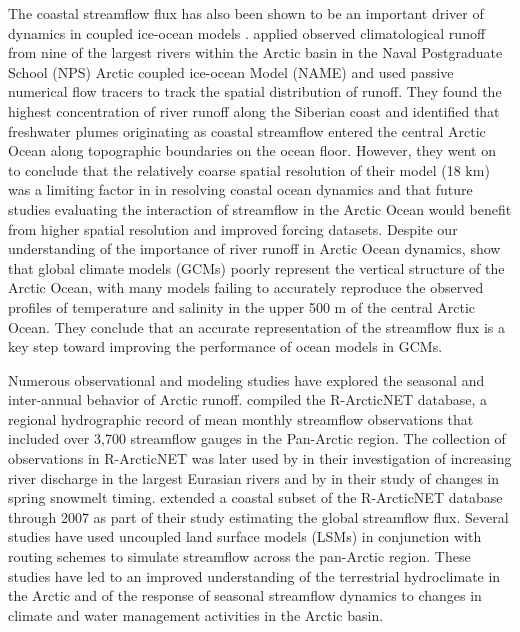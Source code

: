 The coastal streamflow flux has also been shown to be an important driver of dynamics in coupled ice-ocean models \citep[e.g.][]{Newton_2008,Large_2009,Lique_2015}.
\citet{Newton_2008} applied observed climatological runoff from nine of the largest rivers within the Arctic basin in the Naval Postgraduate School (NPS) Arctic coupled ice-ocean Model (NAME) and used passive numerical flow tracers to track the spatial distribution of runoff.
They found the highest concentration of river runoff along the Siberian coast and identified that freshwater plumes originating as coastal streamflow entered the central Arctic Ocean along topographic boundaries on the ocean floor.
However, they went on to conclude that the relatively coarse spatial resolution of their model (18 km) was a limiting factor in in resolving coastal ocean dynamics and that future studies evaluating the interaction of streamflow in the Arctic Ocean would benefit from higher spatial resolution and improved forcing datasets.
Despite our understanding of the importance of river runoff in Arctic Ocean dynamics, \citet{Nummelin_2015} show that global climate models (GCMs) poorly represent the vertical structure of the Arctic Ocean, with many models failing to accurately reproduce the observed profiles of temperature and salinity in the upper 500 m of the central Arctic Ocean.
They conclude that an accurate representation of the streamflow flux is a key step toward improving the performance of ocean models in GCMs.

Numerous observational and modeling studies have explored the seasonal and inter-annual behavior of Arctic runoff.
\citet{Lammers_2001} compiled the R-ArcticNET database, a regional hydrographic record of mean monthly streamflow observations that included over 3,700 streamflow gauges in the Pan-Arctic region.
The collection of observations in R-ArcticNET was later used by \citet{Shiklomanov_2009} in their investigation of increasing river discharge in the largest Eurasian rivers and by \citet{Tan_2011} in their study of changes in spring snowmelt timing.
\citet{Dai_2009} extended a coastal subset of the R-ArcticNET database through 2007 as part of their study estimating the global streamflow flux.
Several studies \citep{Su_2005,Adam_2007,Slater_2007,Adam_2008,Dai_2009} have used uncoupled land surface models (LSMs) in conjunction with routing schemes to simulate streamflow across the pan-Arctic region.
These studies have led to an improved understanding of the terrestrial hydroclimate in the Arctic and of the response of seasonal streamflow dynamics to changes in climate and water management activities in the Arctic basin.

